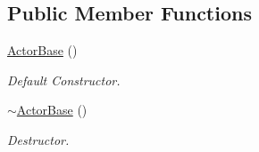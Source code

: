 \subsection*{Public Member Functions}
\begin{DoxyCompactItemize}
\item 
\hypertarget{classContent_1_1Actor_1_1Physics_1_1ActorBase_aa2cfd5e2fd36adf2faaf67008cbaa0e1}{
\hyperlink{classContent_1_1Actor_1_1Physics_1_1ActorBase_aa2cfd5e2fd36adf2faaf67008cbaa0e1}{ActorBase} ()}
\label{classContent_1_1Actor_1_1Physics_1_1ActorBase_aa2cfd5e2fd36adf2faaf67008cbaa0e1}

\begin{DoxyCompactList}\small\item\em Default Constructor. \item\end{DoxyCompactList}\item 
\hypertarget{classContent_1_1Actor_1_1Physics_1_1ActorBase_a09cfb728c2c47b32aa426dabd2184768}{
\hyperlink{classContent_1_1Actor_1_1Physics_1_1ActorBase_a09cfb728c2c47b32aa426dabd2184768}{$\sim$ActorBase} ()}
\label{classContent_1_1Actor_1_1Physics_1_1ActorBase_a09cfb728c2c47b32aa426dabd2184768}

\begin{DoxyCompactList}\small\item\em Destructor. \item\end{DoxyCompactList}\end{DoxyCompactItemize}
